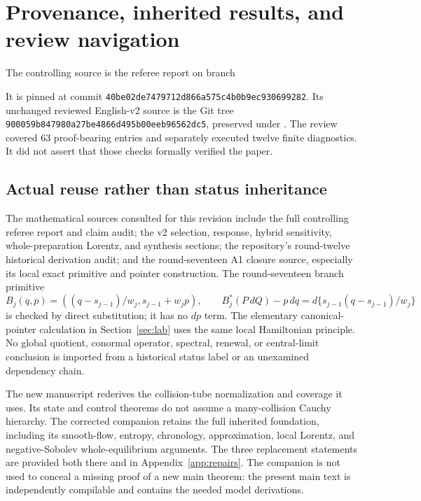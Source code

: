 \section{Provenance, inherited results, and review navigation}\label{app:provenance}
The controlling source is the referee report on branch
\begin{quote}\small
{}
\end{quote}
It is pinned at commit
\texttt{40be02de7479712d866a575c4b0b9ec930699282}. Its unchanged reviewed
English-v2 source is the Git tree
\texttt{900059b847980a27be4866d495b00eeb96562dc5}, preserved under
. The review covered 63
proof-bearing entries and separately executed twelve finite diagnostics.
It did not assert that those checks formally verified the paper.

\subsection{Actual reuse rather than status inheritance}
The mathematical sources consulted for this revision include the full
controlling referee report and claim audit; the v2 selection, response,
hybrid sensitivity, whole-preparation Lorentz, and synthesis sections;
the repository's round-twelve historical derivation audit; and the
round-seventeen A1 closure source, especially its local exact primitive and
pointer construction. The round-seventeen branch primitive
\[
 B_j(q,p)=((q-s_{j-1})/w_j,s_{j-1}+w_jp),\qquad
 B_j^*(P\,dQ)-p\,dq=d\{s_{j-1}(q-s_{j-1})/w_j\}
\]
is checked by direct substitution; it has no $dp$ term. The elementary
canonical-pointer calculation in Section~\ref{sec:lab} uses the same local
Hamiltonian principle. No global quotient, conormal operator, spectral,
renewal, or central-limit conclusion is imported from a historical status
label or an unexamined dependency chain.

The new manuscript rederives the collision-tube normalization and coverage
it uses. Its state and control theorems do not assume a many-collision
Cauchy hierarchy. The corrected companion retains the full inherited
foundation, including its smooth-flow, entropy, chronology, approximation,
local Lorentz, and negative-Sobolev whole-equilibrium arguments. The three
replacement statements are provided both there and in
Appendix~\ref{app:repairs}. The companion is not used to conceal a missing
proof of a new main theorem: the present main text is independently
compilable and contains the needed model derivations.

